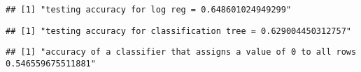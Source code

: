 \documentclass[
]{article}
\newenvironment{Shaded}{\begin{snugshade}}{\end{snugshade}}
\newcommand{\DecValTok}[1]{\textcolor[rgb]{0.00,0.00,0.81}{#1}}
\newcommand{\KeywordTok}[1]{\textcolor[rgb]{0.13,0.29,0.53}{\textbf{#1}}}
\newcommand{\NormalTok}[1]{#1}
\newcommand{\OperatorTok}[1]{\textcolor[rgb]{0.81,0.36,0.00}{\textbf{#1}}}
\newcommand{\StringTok}[1]{\textcolor[rgb]{0.31,0.60,0.02}{#1}}
\begin{document}
\begin{verbatim}
## [1] "testing accuracy for log reg = 0.648601024949299"
\end{verbatim}

\begin{Shaded}
\end{Shaded}

\begin{verbatim}
## [1] "testing accuracy for classification tree = 0.629004450312757"
\end{verbatim}

\begin{Shaded}
\end{Shaded}

\begin{verbatim}
## [1] "accuracy of a classifier that assigns a value of 0 to all rows 0.546559675511881"
\end{verbatim}
\end{document}
